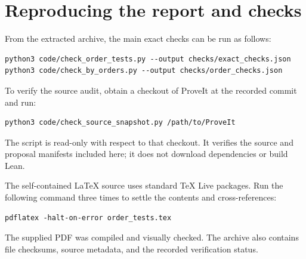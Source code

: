 \documentclass[11pt,a4paper]{article}
\theoremstyle{definition}
\theoremstyle{remark}
\begin{document}
\appendix
\section{Reproducing the report and checks}

From the extracted archive, the main exact checks can be run as follows:
\begin{verbatim}
python3 code/check_order_tests.py --output checks/exact_checks.json
python3 code/check_by_orders.py --output checks/order_checks.json
\end{verbatim}
To verify the source audit, obtain a checkout of ProveIt at the recorded
commit and run:
\begin{verbatim}
python3 code/check_source_snapshot.py /path/to/ProveIt
\end{verbatim}
The script is read-only with respect to that checkout. It verifies the
source and proposal manifests included here; it does not download
dependencies or build Lean.

The self-contained LaTeX source uses standard TeX Live packages. Run the
following command three times to settle the contents and cross-references:
\begin{verbatim}
pdflatex -halt-on-error order_tests.tex
\end{verbatim}
The supplied PDF was compiled and visually checked. The archive also
contains file checksums, source metadata, and the recorded verification status.
\end{document}

